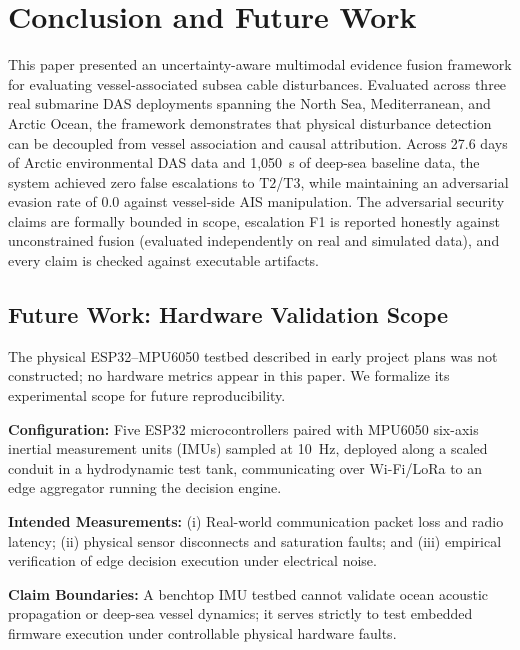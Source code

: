 \documentclass[conference]{IEEEtran}
\newcommand{\dstate}[1]{\ensuremath{\mathrm{#1}}}
\begin{document}
\section{Conclusion and Future Work}
\label{sec:conclusion}

This paper presented an uncertainty-aware multimodal evidence fusion framework
for evaluating vessel-associated subsea cable disturbances. Evaluated across
three real submarine DAS deployments spanning the North Sea, Mediterranean, and
Arctic Ocean, the framework demonstrates that physical disturbance detection
can be decoupled from vessel association and causal attribution. Across 27.6
days of Arctic environmental DAS data and 1,050~s of deep-sea baseline data,
the system achieved zero false escalations to \dstate{T2}/\dstate{T3}, while
maintaining an adversarial evasion rate of 0.0 against vessel-side AIS
manipulation. The adversarial security claims are formally bounded in scope, escalation F1
is reported honestly against unconstrained fusion (evaluated independently on
real and simulated data), and every claim is checked against executable
artifacts.


\subsection{Future Work: Hardware Validation Scope}
\label{sec:hardware}

The physical ESP32--MPU6050 testbed described in early project plans was not
constructed; no hardware metrics appear in this paper. We formalize its
experimental scope for future reproducibility.

\textbf{Configuration:} Five ESP32 microcontrollers paired with MPU6050
six-axis inertial measurement units (IMUs) sampled at 10~Hz, deployed along a scaled
conduit in a hydrodynamic test tank, communicating over Wi-Fi/LoRa to an edge
aggregator running the decision engine.

\textbf{Intended Measurements:} (i) Real-world communication packet loss and
radio latency; (ii) physical sensor disconnects and saturation faults; and
(iii) empirical verification of edge decision execution under electrical noise.

\textbf{Claim Boundaries:} A benchtop IMU testbed cannot validate ocean
acoustic propagation or deep-sea vessel dynamics; it serves strictly to test
embedded firmware execution under controllable physical hardware faults.
\end{document}
